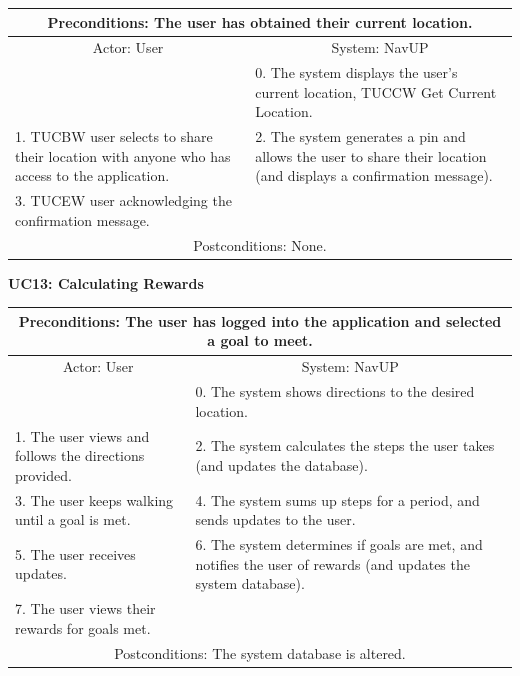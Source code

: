 ﻿\documentclass{article}
\begin{document}
       		 \begin{tabular}{|p{6cm}|p{6cm}|}
       		 \hline
       		\multicolumn{2}{c}{ Preconditions: The user has obtained their current location.} \\
       		 \hline
       		 \multicolumn{1}{c}{Actor: User} & \multicolumn{1}{c}{ System: NavUP} \\
        		\hline
       		  & 0.	The system displays the user's current location, TUCCW Get Current Location.\\
       		 \hline
       		 1.	TUCBW user selects to share their location with anyone who has access to the application. & 2.	The system generates a pin and allows the user to share their location (and displays a confirmation message).\\
        		\hline
       		3.	TUCEW user acknowledging the confirmation message. &\\
       		 \hline
        		\multicolumn{2}{c}{Postconditions: None.} \\
        		\hline
        \end{tabular} 
      

				\vspace{5mm}
                \begin{flushleft}
				\textbf{UC13: Calculating Rewards}\\
				\end{flushleft}
        		\centering	
       		 \small
       		 \begin{tabular}{|p{6cm}|p{6cm}|}
       		 \hline
       		 \multicolumn{2}{c}{Preconditions: The user has logged into the application and selected a goal to meet.} \\
       		 \hline
       		 \multicolumn{1}{c}{Actor: User} & \multicolumn{1}{c}{ System: NavUP} \\
        		\hline
       		 & 0.	The system shows directions to the desired location.\\
       		 \hline
       		 1.	The user views and follows the directions provided. & 2.	The system calculates the steps the user takes (and updates the database).\\
        		\hline
       		 3.	The user keeps walking until a goal is met. & 4.	The system sums up steps for a period, and sends updates to the user.\\
        		\hline
       		 5.	The user receives updates. & 6.	The system determines if goals are met, and notifies the user of rewards (and updates the system database).\\
        		\hline
        		7.	The user views their rewards for goals met. & \\
       		 \hline
        		\multicolumn{2}{c}{Postconditions: The system database is altered. } \\
        		\hline
        \end{tabular} 
        
\end{document}
